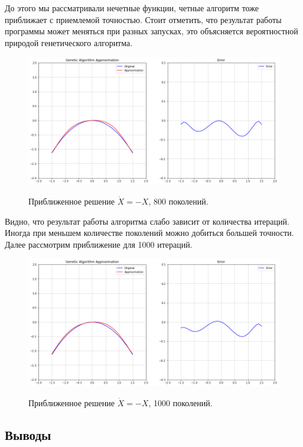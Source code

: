 \documentclass[12pt, a4paper]{article}
\begin{document}
    До этого мы рассматривали нечетные функции, четные алгоритм тоже 
    приближает с приемлемой точностью. Стоит отметить, что результат работы 
    программы может меняться при разных запусках, это объясняется 
    вероятностной природой генетического алгоритма.
    
    \begin{figure}[h!]
        \center
        \includegraphics[width = 13cm]{f3_800.png}
        \label{image332}
        \caption{Приближенное решение $\dot{X} = -X$, 800 поколений.}
    \end{figure}
    
    Видно, что результат работы алгоритма слабо зависит от количества 
    итераций. Иногда при меньшем количестве поколений можно добиться большей 
    точности. Далее рассмотрим приближение для 1000 итераций.
    
    \begin{figure}[h!]
        \center
        \includegraphics[width = 13cm]{f3_1000.png}
        \label{image333}
        \caption{Приближенное решение $\dot{X} = -X$, 1000 поколений.}
    \end{figure}
    
    \subsection{Выводы}
    
\end{document}
